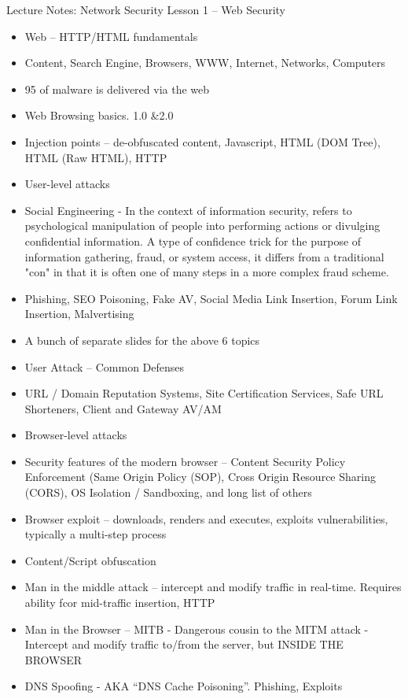 \documentclass[12pt]{article}
\begin{document}
\newpage
Lecture Notes: Network Security 
\newline
Lesson 1 – Web Security
\begin{itemize}
\item Web – HTTP/HTML fundamentals 
\item Content, Search Engine, Browsers, WWW, Internet, Networks, Computers
\item 95 of malware is delivered via the web
\item Web Browsing basics. 1.0 &2.0
\item Injection points – de-obfuscated content, Javascript, HTML (DOM Tree), HTML (Raw HTML), HTTP
\item User-level attacks
\item Social Engineering - In the context of information security, refers to psychological manipulation of people into performing actions or divulging confidential information. A type of confidence trick for the purpose of information gathering, fraud, or system access, it differs from a traditional "con" in that it is often one of many steps in a more complex fraud scheme.
\item Phishing, SEO Poisoning, Fake AV, Social Media Link Insertion, Forum Link Insertion, Malvertising
\item A bunch of separate slides for the above 6 topics 
\item User Attack – Common Defenses
\item URL / Domain Reputation Systems, Site Certification Services, Safe URL Shorteners, Client and Gateway AV/AM
\item Browser-level attacks
\item Security features of the modern browser – Content Security Policy Enforcement (Same Origin Policy (SOP), Cross Origin Resource Sharing (CORS), OS Isolation / Sandboxing, and long list of others
\item Browser exploit – downloads, renders and executes, exploits vulnerabilities, typically a multi-step process
\item Content/Script obfuscation
\item Man in the middle attack – intercept and modify traffic in real-time. Requires ability fcor mid-traffic insertion, HTTP
\item Man in the Browser – MITB - Dangerous cousin to the MITM attack - Intercept and modify traffic to/from the server, but INSIDE THE BROWSER
\item DNS Spoofing - AKA “DNS Cache Poisoning”. Phishing, Exploits

\end{itemize}
\end{document}
